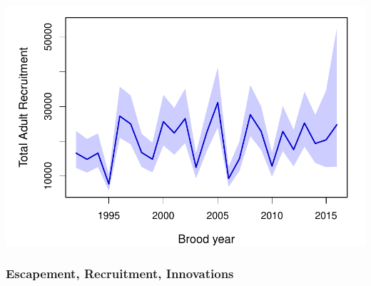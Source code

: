 \documentclass[
  11pt,
]{article}
\begin{document}
\includegraphics{App_2_Summarize_results_Summer_Fall_Chinook_files/figure-latex/plot_recruitment-1.pdf}

\hypertarget{escapement-recruitment-innovations}{%
\subsubsection{Escapement, Recruitment,
Innovations}\label{escapement-recruitment-innovations}}
\end{document}

